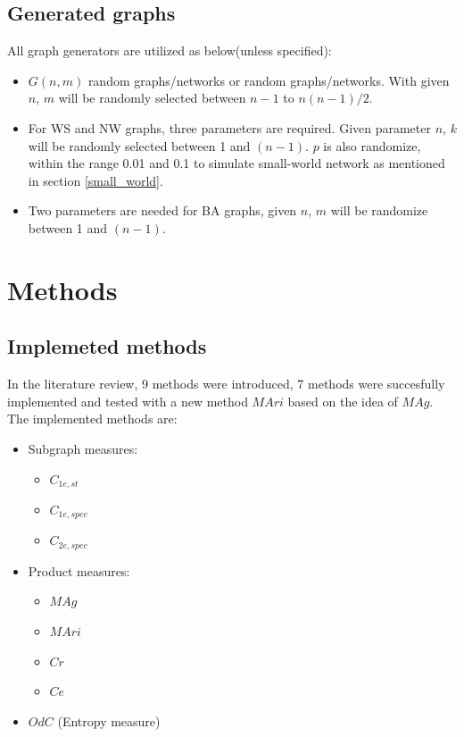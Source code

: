 \documentclass[12pt]{article}
\begin{document}
\subsection{Generated graphs}
\label{generate_graphs}
All graph generators are utilized as below(unless specified):
\begin{itemize}
    \item $G(n,m)$ random graphs/networks or random graphs/networks. With given $n$, $m$ will be randomly selected between $n-1$ to $n(n-1)/2$.
    \item For WS and NW graphs, three parameters are required. Given parameter $n$, $k$ will be randomly selected between 1 and $(n-1)$. $p$ is also randomize, within the range 0.01 and 0.1 to simulate small-world network as mentioned in section \ref{small_world}.
    \item Two parameters are needed for BA graphs, given $n$, $m$ will be randomize between 1 and $(n-1)$.
\end{itemize}

\section{Methods}
\subsection{Implemeted methods}
In the literature review, 9 methods were introduced, 7 methods were succesfully implemented and tested with a new method $MAri$ based on the idea of $MAg$. The implemented methods are:
\begin{itemize}
    \item Subgraph measures:
    \begin{itemize}
        \item $C_{1e,st}$
        \item $C_{1e,spec}$
        \item $C_{2e,spec}$
    \end{itemize}
    \item Product measures:
    \begin{itemize}
        \item $MAg$
        \item $MAri$
        \item $Cr$
        \item $Ce$
    \end{itemize}
    \item $OdC$ (Entropy measure)
\end{itemize}
\end{document}
